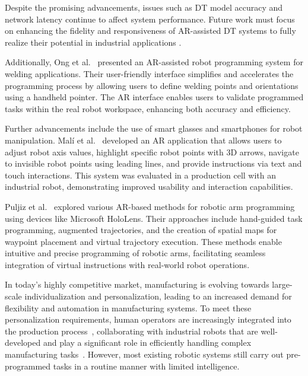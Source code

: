 \begin{enumerate}
    Despite the promising advancements, issues such as \ac{DT} model accuracy and network latency continue to affect system performance. Future work must 
    focus on enhancing the fidelity and responsiveness of \ac{AR}-assisted \ac{DT} systems to fully realize their potential in industrial applications 
    \cite{LI2022102321}.

    Additionally, Ong et al.~\cite{ong2020} presented an AR-assisted robot programming system for welding applications. Their user-friendly interface 
    simplifies and accelerates the programming process by allowing users to define welding points and orientations using a handheld pointer. 
    The \ac{AR} interface enables users to validate programmed tasks within the real robot workspace, enhancing both accuracy and efficiency.
    
    Further advancements include the use of smart glasses and smartphones for robot manipulation. Malí et al.~\cite{7819154} developed an \ac{AR} 
    application that allows users to adjust robot axis values, highlight specific robot points with 3D arrows, navigate to invisible robot points using
    leading lines, and provide instructions via text and touch interactions. This system was evaluated in a production cell with an industrial robot, 
    demonstrating improved usability and interaction capabilities.

    Puljiz et al.~\cite{puljiz2019conceptsendtoendaugmentedreality,puljiz2} explored various AR-based methods for robotic arm programming using devices like Microsoft HoloLens. 
    Their approaches include hand-guided task programming, augmented trajectories, and the creation of spatial maps for waypoint placement and virtual 
    trajectory execution. These methods enable intuitive and precise programming of robotic arms, facilitating seamless integration of virtual instructions 
    with real-world robot operations.
    
    In today's highly competitive market, manufacturing is evolving towards large-scale individualization and personalization, leading to an increased demand for flexibility and automation in manufacturing systems. To meet these personalization requirements, human operators are increasingly integrated into the production process~\cite{1}, collaborating with industrial robots that are well-developed and play a significant role in efficiently handling complex manufacturing tasks~\cite{2,3}.
    However, most existing robotic systems still carry out pre-programmed tasks in a routine manner with limited intelligence.


\end{enumerate}
